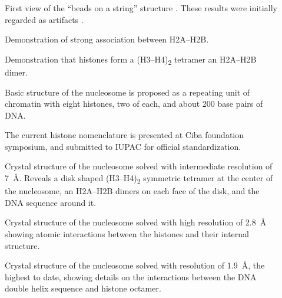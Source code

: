 \begin{description}
        \item[\cite{olins1974-nu-bodies}]
        First view of the ``beads on a string'' structure
        .
        These results were initially
        regarded as artifacts \citep{pardon-wilkins-1972model}.

        \item[\cite{anna-isenberg-1974-h2a-h2b}]
        Demonstration of strong association between H2A--H2B.

        \item[\cite{kornberg1974-results}]
        Demonstration that histones form a (H3--H4)\textsubscript{2} tetramer
        an H2A--H2B dimer.

        \item[\cite{kornberg1974-model}]
        Basic structure of the nucleosome is proposed as a repeating
        unit of chromatin with eight histones, two of each, and about
        200 base pairs of DNA.

        \item[\cite{bradbury1975-histone-nomenclature}]
        The current histone nomenclature is presented at Ciba foundation
        symposium, and submitted to IUPAC for official standardization.

        \item[\cite{richmond1984-7angstrom}]
        Crystal structure of the nucleosome solved with intermediate
        resolution of \SI{7}{\angstrom}.
        Reveals a disk shaped (H3--H4)\textsubscript{2} symmetric
        tetramer at the center of the nucleosome, an H2A--H2B dimers
        on each face of the disk, and the DNA sequence around it.

        \item[\cite{luger1997-28angstrom}]
        Crystal structure of the nucleosome solved with high
        resolution of \SI{2.8}{\angstrom} showing atomic interactions
        between the histones and their internal structure.

        \item[\cite{richmond-1kx5-19ansgtrom}]
        Crystal structure of the nucleosome solved with resolution of
        \SI{1.9}{\angstrom}, the highest to date, showing details on
        the interactions between the DNA double helix sequence and
        histone octamer.
      \end{description}


